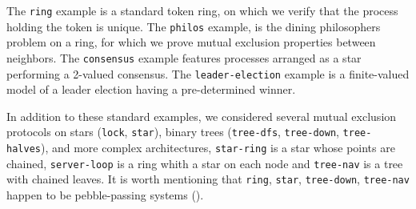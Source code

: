 


The \texttt{ring} example is a standard token ring, on which we verify
that the process holding the token is unique.  The \texttt{philos}
example, is the dining philosophers problem on a ring, for which we
prove mutual exclusion properties between neighbors.  The
\texttt{consensus} example features processes arranged as a star performing a
2-valued consensus. The \texttt{leader-election} example is a
finite-valued model of a leader election having a pre-determined
winner.


In addition to these standard examples, we considered several mutual
exclusion protocols on stars (\texttt{lock}, \texttt{star}), binary
trees (\texttt{tree-dfs}, \texttt{tree-down}, \texttt{tree-halves}),
and more complex architectures, \eg \texttt{star-ring} is a star whose
points are chained, \texttt{server-loop} is a ring whith a star on
each node and \texttt{tree-nav} is a tree with chained leaves. It is
worth mentioning that \texttt{ring}, \texttt{star},
\texttt{tree-down}, \texttt{tree-nav} happen to be pebble-passing
systems ().

